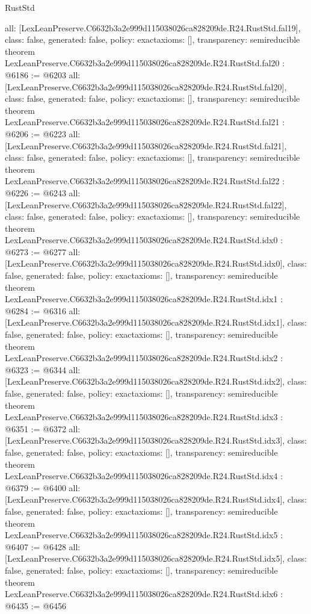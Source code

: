 \begin{lexlean}{RustStd}
\begin{coremodule}
{  all: [LexLeanPreserve.C6632b3a2e999d115038026ca828209de.R24.RustStd.fal19],
  class: false,
  generated: false,
  policy: exact{axioms: []},
  transparency: semireducible
}
theorem LexLeanPreserve.C6632b3a2e999d115038026ca828209de.R24.RustStd.fal20 : @6186 := @6203 {
  all: [LexLeanPreserve.C6632b3a2e999d115038026ca828209de.R24.RustStd.fal20],
  class: false,
  generated: false,
  policy: exact{axioms: []},
  transparency: semireducible
}
theorem LexLeanPreserve.C6632b3a2e999d115038026ca828209de.R24.RustStd.fal21 : @6206 := @6223 {
  all: [LexLeanPreserve.C6632b3a2e999d115038026ca828209de.R24.RustStd.fal21],
  class: false,
  generated: false,
  policy: exact{axioms: []},
  transparency: semireducible
}
theorem LexLeanPreserve.C6632b3a2e999d115038026ca828209de.R24.RustStd.fal22 : @6226 := @6243 {
  all: [LexLeanPreserve.C6632b3a2e999d115038026ca828209de.R24.RustStd.fal22],
  class: false,
  generated: false,
  policy: exact{axioms: []},
  transparency: semireducible
}
theorem LexLeanPreserve.C6632b3a2e999d115038026ca828209de.R24.RustStd.idx0 : @6273 := @6277 {
  all: [LexLeanPreserve.C6632b3a2e999d115038026ca828209de.R24.RustStd.idx0],
  class: false,
  generated: false,
  policy: exact{axioms: []},
  transparency: semireducible
}
theorem LexLeanPreserve.C6632b3a2e999d115038026ca828209de.R24.RustStd.idx1 : @6284 := @6316 {
  all: [LexLeanPreserve.C6632b3a2e999d115038026ca828209de.R24.RustStd.idx1],
  class: false,
  generated: false,
  policy: exact{axioms: []},
  transparency: semireducible
}
theorem LexLeanPreserve.C6632b3a2e999d115038026ca828209de.R24.RustStd.idx2 : @6323 := @6344 {
  all: [LexLeanPreserve.C6632b3a2e999d115038026ca828209de.R24.RustStd.idx2],
  class: false,
  generated: false,
  policy: exact{axioms: []},
  transparency: semireducible
}
theorem LexLeanPreserve.C6632b3a2e999d115038026ca828209de.R24.RustStd.idx3 : @6351 := @6372 {
  all: [LexLeanPreserve.C6632b3a2e999d115038026ca828209de.R24.RustStd.idx3],
  class: false,
  generated: false,
  policy: exact{axioms: []},
  transparency: semireducible
}
theorem LexLeanPreserve.C6632b3a2e999d115038026ca828209de.R24.RustStd.idx4 : @6379 := @6400 {
  all: [LexLeanPreserve.C6632b3a2e999d115038026ca828209de.R24.RustStd.idx4],
  class: false,
  generated: false,
  policy: exact{axioms: []},
  transparency: semireducible
}
theorem LexLeanPreserve.C6632b3a2e999d115038026ca828209de.R24.RustStd.idx5 : @6407 := @6428 {
  all: [LexLeanPreserve.C6632b3a2e999d115038026ca828209de.R24.RustStd.idx5],
  class: false,
  generated: false,
  policy: exact{axioms: []},
  transparency: semireducible
}
theorem LexLeanPreserve.C6632b3a2e999d115038026ca828209de.R24.RustStd.idx6 : @6435 := @6456 {
}
\end{coremodule}
\end{lexlean}
